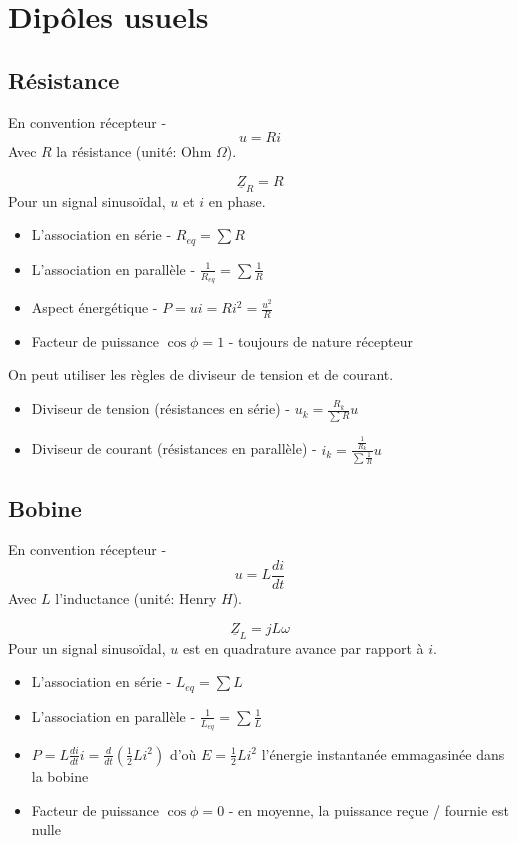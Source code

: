 \documentclass[openany]{book}
\begin{document}
\section{Dipôles usuels}

\subsection{Résistance}
En convention récepteur - 
\[ u = Ri \]
Avec $R$ la résistance (unité: Ohm $\Omega$).

\[\underline{Z}_R = R\]
\noindent Pour un signal sinusoïdal, $u$ et $i$ en phase.

\begin{itemize}
    \item L'association en série - $R_{eq}=\sum R$
    \item L'association en parallèle - $\frac{1}{R_{eq}}=\sum \frac{1}{R}$
    \item Aspect énergétique - $ P = ui = Ri^2 = \frac{u^2}{R}$
    \item Facteur de puissance $\cos{\phi} = 1$ - toujours de nature récepteur
\end{itemize}

On peut utiliser les règles de diviseur de tension et de courant.
\begin{itemize}
    \item Diviseur de tension (résistances en série) - $u_k = \frac{R_k}{\sum R}u$
    \item Diviseur de courant (résistances en parallèle) - $i_k = \frac{\frac{1}{R_k}}{\sum \frac{1}{R}}u$
\end{itemize}

\subsection{Bobine}
En convention récepteur - 
\[ u = L\frac{di}{dt} \]
Avec $L$ l'inductance (unité: Henry $H$).

\[\underline{Z}_L = jL\omega\]
\noindent Pour un signal sinusoïdal, $u$ est en quadrature avance par rapport à $i$.

\begin{itemize}
    \item L'association en série - $L_{eq}=\sum L$
    \item L'association en parallèle - $\frac{1}{L_{eq}}=\sum \frac{1}{L}$
    \item $ P = L\frac{di}{dt}i=\frac{d}{dt}(\frac{1}{2}Li^2) $ d'où $ E = \frac{1}{2}Li^2 $ l'énergie instantanée emmagasinée dans la bobine
    \item Facteur de puissance $\cos{\phi} = 0$ - en moyenne, la puissance reçue / fournie est nulle
\end{itemize}
\end{document}
